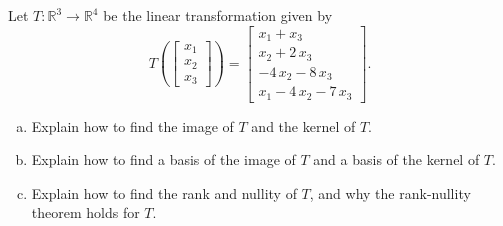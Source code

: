 
\begin{exerciseStatement}
 Let \(T:\mathbb{R}^ 3  \to \mathbb{R}^ 4 \) be the linear transformation given by \[T\left(  \left[\begin{array}{c}
x_{1} \\
x_{2} \\
x_{3}
\end{array}\right]  \right) =  \left[\begin{array}{c}
x_{1} + x_{3} \\
x_{2} + 2 \, x_{3} \\
-4 \, x_{2} - 8 \, x_{3} \\
x_{1} - 4 \, x_{2} - 7 \, x_{3}
\end{array}\right] .\]
\begin{enumerate}[(a)]
\item Explain how to find the image of \(T\) and the kernel of \(T\).
\item Explain how to find a basis of the image of \(T\) and a basis of the kernel of \(T\).
\item Explain how to find the rank and nullity of \(T\), and why the rank-nullity theorem holds for \(T\).
\end{enumerate}
    
\end{exerciseStatement}
    

